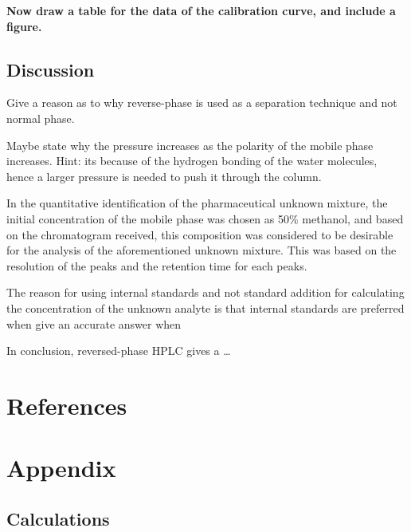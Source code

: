 \documentclass[a4paper, 12pt]{article}
\begin{document}
\textbf{Now draw a table for the data of the calibration curve, and include a figure.}

\subsection{Discussion}
Give a reason as to why reverse-phase is used as a separation technique and not normal phase.

Maybe state why the pressure increases as the polarity of the mobile phase increases. Hint: its because of the hydrogen bonding of the water molecules, hence a larger pressure is needed to push it through the column.

In the quantitative identification of the pharmaceutical unknown mixture, the initial concentration of the mobile phase was chosen as 50\% methanol, and based on the chromatogram received, this composition was considered to be desirable for the analysis of the aforementioned unknown mixture. This was based on the resolution of the peaks and the retention time for each peaks.

The reason for using internal standards and not standard addition for calculating the concentration of the unknown analyte is that internal standards are preferred when give an accurate answer when 

In conclusion, reversed-phase HPLC gives a \dots


\section{References}
\printbibliography


\section{Appendix}

\subsection{Calculations}
\end{document}
